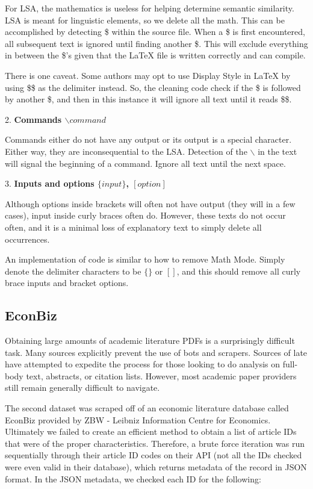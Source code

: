 \documentclass [12pt]{article}
\begin{document}
For LSA, the mathematics is useless for helping determine semantic similarity. LSA is meant for linguistic elements, so we delete all the math. This can be accomplished by detecting \$ within the source file. When a \$ is first encountered,  all subsequent text is ignored until finding another \$. This will exclude everything in between the \$'s given that the LaTeX file is written correctly and can compile. 

There is one caveat. Some authors may opt to use Display Style in LaTeX by using \$\$ as the delimiter instead. So, the cleaning code check if the \$ is followed by another \$, and then in this instance it will ignore all text until it reads \$\$. 

2. \textbf{Commands $\backslash command$}

Commands either do not have any output or its output is a special character. Either way, they are inconsequential to the LSA. Detection of the $\backslash$ in the text will signal the beginning of a command. Ignore all text until the next space. 

3. \textbf{Inputs and options $\{input\}$, $[option]$}

Although options inside brackets will often not have output (they will in a few cases), input inside curly braces often do. However, these texts do not occur often, and it is a minimal loss of explanatory text to simply delete all occurrences. 

An implementation of code is similar to how to remove Math Mode. Simply denote the delimiter characters to  be $\{\}$ or $[]$, and this should remove all curly brace inputs and bracket options. 

\subsection{EconBiz} 

Obtaining large amounts of academic literature PDFs is a surprisingly difficult task. Many sources explicitly prevent the use of bots and scrapers. Sources of late have attempted to expedite the process for those looking to do analysis on full-body text, abstracts, or citation lists. However, most academic paper providers still remain generally difficult to navigate. 

The second dataset was scraped off of an economic literature database called EconBiz provided by  ZBW - Leibniz Information Centre for Economics. Ultimately we failed to create an efficient method to obtain a list of article IDs that were of the proper characteristics. Therefore, a brute force iteration was run sequentially through their article ID codes on their API (not all the IDs checked were even valid in their database), which returns metadata of the record in JSON format. In the JSON metadata, we checked each ID for the following: 
\end{document}

